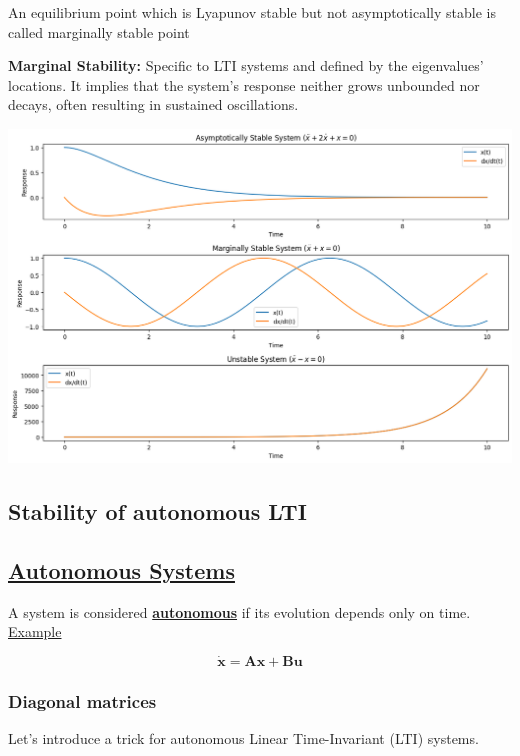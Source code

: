 An equilibrium point which is Lyapunov stable but not asymptotically stable is called marginally stable point


\textbf{Marginal Stability:} Specific to LTI systems and defined by the eigenvalues' locations. It implies that the system's response neither grows unbounded nor decays, often resulting in sustained oscillations.


\begin{center}
    \includegraphics[scale=0.42]{images/stability_plots.png}
\end{center}

\subsection{Stability of autonomous LTI}

\subsection*{\underline{Autonomous Systems}}

A system is considered \underline{\textbf{autonomous}} if its evolution depends only on time.\\

\underline{Example}

\[
\mathbf{\dot{x}}=\mathbf{A}\mathbf{x} + \mathbf{B}\mathbf{u}
\]

\subsubsection{Diagonal matrices}

Let's introduce a trick for autonomous Linear Time-Invariant (LTI) systems.

